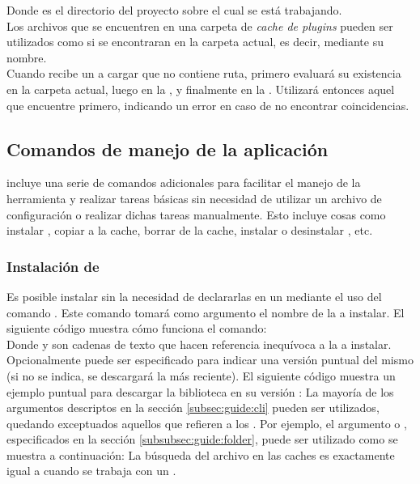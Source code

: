 Donde  es el directorio del proyecto sobre el cual 
se está trabajando.\\
Los archivos \jar que se encuentren en una carpeta de \emph{cache de plugins} 
pueden  ser utilizados como si se encontraran en la carpeta actual, es decir, 
mediante su nombre.\\
Cuando \fronttier recibe un \plugin a cargar que no contiene ruta, primero 
evaluará su existencia en la carpeta actual, luego en la \plugincachel, y 
finalmente en la \plugincacheg. Utilizará entonces aquel que  encuentre 
primero, indicando un error en caso de no encontrar coincidencias.\\

\subsection{Comandos de manejo de la aplicación}
\label{subsec:commands}

\fronttier incluye una serie de comandos adicionales para facilitar el manejo de
la herramienta y realizar tareas básicas sin necesidad de utilizar un archivo
de configuración o realizar dichas tareas manualmente. Esto incluye cosas como
instalar \dependencies, copiar \dependencies a la cache, borrar \dependencies 
de la cache, instalar o desinstalar \plugins, etc.

\subsubsection{Instalación de \dependencies}
\label{subsubsec:commands:install}

Es posible instalar \dependencies sin la necesidad de declararlas en un 
\conffile mediante el uso del comando . Este comando tomará como 
argumento el nombre de la \dependency a instalar. El siguiente código muestra 
cómo funciona el comando:\\
Donde  y  son cadenas de texto que hacen referencia 
inequívoca a la \dependency a instalar. Opcionalmente  puede ser 
especificado para indicar una versión puntual del mismo (si no se indica, se 
descargará la más reciente). El siguiente código muestra un ejemplo 
puntual para descargar la biblioteca  en su versión :
La mayoría de los argumentos descriptos en la sección \ref{subsec:guide:cli} 
pueden ser utilizados, quedando exceptuados aquellos que refieren a los  
\conffiles. Por ejemplo, el argumento  o , 
especificados en la sección \ref{subsubsec:guide:folder}, puede ser utilizado 
como se muestra a continuación:
La búsqueda del archivo en las caches es exactamente igual a cuando se trabaja 
con un \conffile. 

